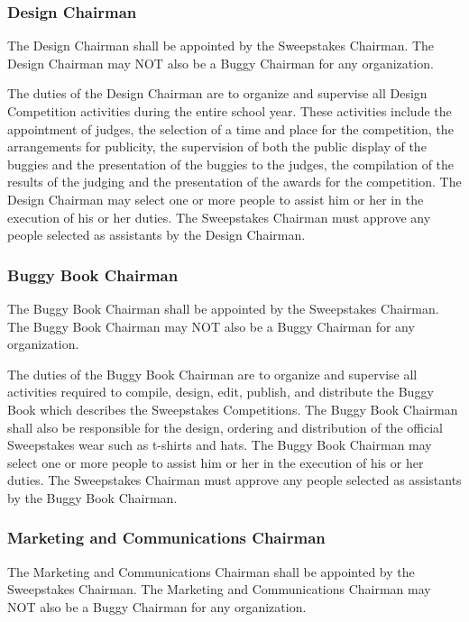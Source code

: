 \subsubsection{Design Chairman}

	The Design Chairman shall be appointed by the Sweepstakes Chairman. The Design Chairman may NOT also be a Buggy Chairman for any organization.

	The duties of the Design Chairman are to organize and supervise all Design Competition activities during the entire school year. These activities include the appointment of judges, the selection of a time and place for the competition, the arrangements for publicity, the supervision of both the public display of the buggies and the presentation of the buggies to the judges, the compilation of the results of the judging and the presentation of the awards for the competition. The Design Chairman may select one or more people to assist him or her in the execution of his or her duties. The Sweepstakes Chairman must approve any people selected as assistants by the Design Chairman.

\subsubsection{Buggy Book Chairman}

	The Buggy Book Chairman shall be appointed by the Sweepstakes Chairman. The Buggy Book Chairman may NOT also be a Buggy Chairman for any organization.

	The duties of the Buggy Book Chairman are to organize and supervise all activities required to compile, design, edit, publish, and distribute the Buggy Book which describes the Sweepstakes Competitions. The Buggy Book Chairman shall also be responsible for the design, ordering and distribution of the official Sweepstakes wear such as t-shirts and hats. The Buggy Book Chairman may select one or more people to assist him or her in the execution of his or her duties. The Sweepstakes Chairman must approve any people selected as assistants by the Buggy Book Chairman.

\subsubsection{Marketing and Communications Chairman}

	The Marketing and Communications Chairman shall be appointed by the Sweepstakes Chairman. The Marketing and Communications Chairman may NOT also be a Buggy Chairman for any organization. 

